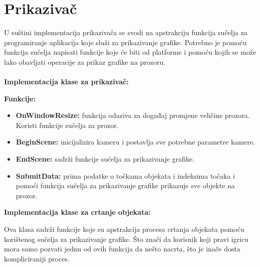 \documentclass{mathos}
\begin{document}
\section{Prikazivač}
U suštini implementacija prikazivača se svodi na apstrakciju funkcija sučelja za programiranje aplikacija koje služi za prikazivanje grafike. Potrebno je pomoću funkcija sučelja
napisati funkcije koje će biti od platforme i pomoću kojih se može lako obavljati operacije za prikaz grafike na prozoru.
\\ \\
\textbf{Implementacija klase za prikazivač:}

\textbf{Funkcije: }
\begin{itemize}
    \item \textbf{OnWindowResize:} funkcija odaziva za događaj promjene veličine prozora. Koristi funkcije sučelja za prozor.
    \item \textbf{BeginScene:} inicijalizira kameru i postavlja sve potrebne parametre kamere.
    \item \textbf{EndScene:} sadrži funkcije sučelja za prikazivanje grafike.
    \item \textbf{SubmitData:} prima podatke o točkama objekata i indeksima točaka i pomoći funkcija sučelja za prikazivanje grafike prikazuje sve objekte na prozor.
\end{itemize}
\textbf{Implementacija klase za crtanje objekata:}

Ova klasa sadrži funkcije koje su apstrakcija procesa crtanja objekata pomoću korištenog sučelja za prikazivanje grafike. Što znači da korisnik koji pravi igricu mora samo
pozvati jednu od ovih funkcija da nešto nacrta, što je inače dosta kompliciraniji proces.
\end{document}
